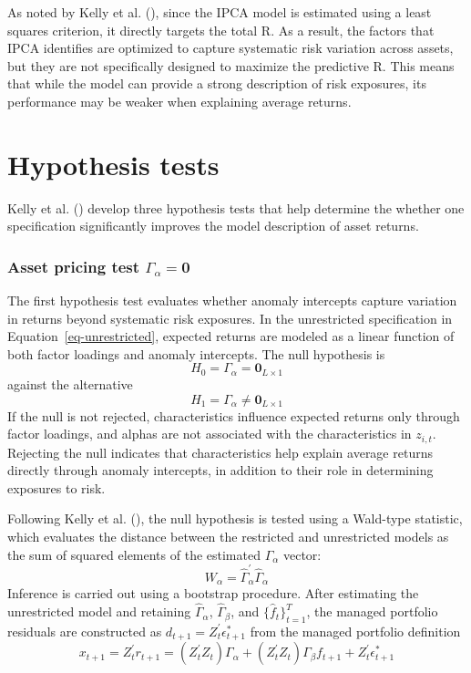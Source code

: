 \documentclass[
  12pt,
  a4paper,
  openany]{scrbook}
\begin{document}
As noted by Kelly et al.
(), since the IPCA model
is estimated using a least squares criterion, it directly targets the
total R. As a result, the factors that IPCA identifies are optimized to
capture systematic risk variation across assets, but they are not
specifically designed to maximize the predictive R. This means that
while the model can provide a strong description of risk exposures, its
performance may be weaker when explaining average returns.

\section{Hypothesis tests}\label{hypothesis-tests}

Kelly et al. () develop
three hypothesis tests that help determine the whether one specification
significantly improves the model description of asset returns.

\subsubsection{\texorpdfstring{Asset pricing test
\(\Gamma_\alpha = \mathbf{0}\)}{Asset pricing test \textbackslash Gamma\_\textbackslash alpha = \textbackslash mathbf\{0\}}}\label{asset-pricing-test-gamma_alpha-mathbf0}

The first hypothesis test evaluates whether anomaly intercepts capture
variation in returns beyond systematic risk exposures. In the
unrestricted specification in Equation~\ref{eq-unrestricted}, expected
returns are modeled as a linear function of both factor loadings and
anomaly intercepts. The null hypothesis is \[
H_0 = \Gamma_\alpha = \mathbf{0}_{L \times 1}
\] against the alternative \[
H_1 = \Gamma_\alpha \neq \mathbf{0}_{L \times 1}
\] If the null is not rejected, characteristics influence expected
returns only through factor loadings, and alphas are not associated with
the characteristics in \(z_{i,t}\). Rejecting the null indicates that
characteristics help explain average returns directly through anomaly
intercepts, in addition to their role in determining exposures to risk.

Following Kelly et al.
(), the null hypothesis
is tested using a Wald-type statistic, which evaluates the distance
between the restricted and unrestricted models as the sum of squared
elements of the estimated \(\Gamma_\alpha\) vector:
\[W_\alpha = \hat\Gamma^{\prime}_\alpha\hat\Gamma_\alpha\] Inference is
carried out using a bootstrap procedure. After estimating the
unrestricted model and retaining \(\hat\Gamma_\alpha\),
\(\hat\Gamma_\beta\), and \({\{\hat f_t}\}_{t=1}^T\), the managed
portfolio residuals are constructed as
\(d_{t+1} = Z_t^\prime \epsilon^*_{t+1}\) from the managed portfolio
definition \[
x_{t+1} = Z_t^\prime r_{t+1} = (Z_t^\prime Z_t)\Gamma_\alpha + (Z_t^\prime Z_t)\Gamma_\beta f_{t+1} + Z_t^\prime \epsilon^*_{t+1}
\]
\end{document}
